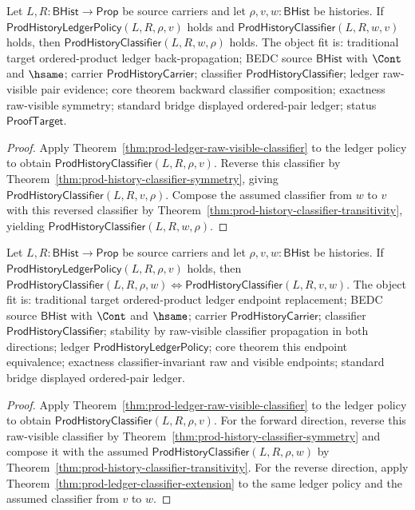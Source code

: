 \begin{theorem}
\label{thm:prod-ledger-classifier-backward-composition}
Let $L,R:\mathsf{BHist}\to\mathsf{Prop}$ be source carriers and let
$\rho,v,w:\mathsf{BHist}$ be histories. If
$\mathsf{ProdHistoryLedgerPolicy}(L,R,\rho,v)$ holds and
$\mathsf{ProdHistoryClassifier}(L,R,w,v)$ holds, then
$\mathsf{ProdHistoryClassifier}(L,R,w,\rho)$ holds. The object fit is:
traditional target ordered-product ledger back-propagation; BEDC source
$\mathsf{BHist}$ with $\Cont$ and $\hsame$; carrier
$\mathsf{ProdHistoryCarrier}$; classifier $\mathsf{ProdHistoryClassifier}$;
ledger raw-visible pair evidence; core theorem backward classifier
composition; exactness raw-visible symmetry; standard bridge displayed
ordered-pair ledger; status $\mathsf{ProofTarget}$.
\end{theorem}
\begin{proof}
Apply Theorem~\ref{thm:prod-ledger-raw-visible-classifier} to the ledger
policy to obtain $\mathsf{ProdHistoryClassifier}(L,R,\rho,v)$. Reverse this
classifier by Theorem~\ref{thm:prod-history-classifier-symmetry}, giving
$\mathsf{ProdHistoryClassifier}(L,R,v,\rho)$. Compose the assumed classifier
from $w$ to $v$ with this reversed classifier by
Theorem~\ref{thm:prod-history-classifier-transitivity}, yielding
$\mathsf{ProdHistoryClassifier}(L,R,w,\rho)$.
\end{proof}

\begin{theorem}
\label{thm:prod-ledger-classifier-endpoint-equivalence}
Let $L,R:\mathsf{BHist}\to\mathsf{Prop}$ be source carriers and let
$\rho,v,w:\mathsf{BHist}$ be histories. If
$\mathsf{ProdHistoryLedgerPolicy}(L,R,\rho,v)$ holds, then
$\mathsf{ProdHistoryClassifier}(L,R,\rho,w) \Longleftrightarrow
\mathsf{ProdHistoryClassifier}(L,R,v,w)$. The object fit is:
traditional target ordered-product ledger endpoint replacement; BEDC source
$\mathsf{BHist}$ with $\Cont$ and $\hsame$; carrier
$\mathsf{ProdHistoryCarrier}$; classifier $\mathsf{ProdHistoryClassifier}$;
stability by raw-visible classifier propagation in both directions; ledger
$\mathsf{ProdHistoryLedgerPolicy}$; core theorem this endpoint equivalence;
exactness classifier-invariant raw and visible endpoints; standard bridge
displayed ordered-pair ledger.
\end{theorem}
\begin{proof}
Apply Theorem~\ref{thm:prod-ledger-raw-visible-classifier} to the ledger
policy to obtain $\mathsf{ProdHistoryClassifier}(L,R,\rho,v)$. For the forward
direction, reverse this raw-visible classifier by
Theorem~\ref{thm:prod-history-classifier-symmetry} and compose it with the
assumed $\mathsf{ProdHistoryClassifier}(L,R,\rho,w)$ by
Theorem~\ref{thm:prod-history-classifier-transitivity}. For the reverse
direction, apply
Theorem~\ref{thm:prod-ledger-classifier-extension} to the same ledger policy
and the assumed classifier from $v$ to $w$.
\end{proof}

